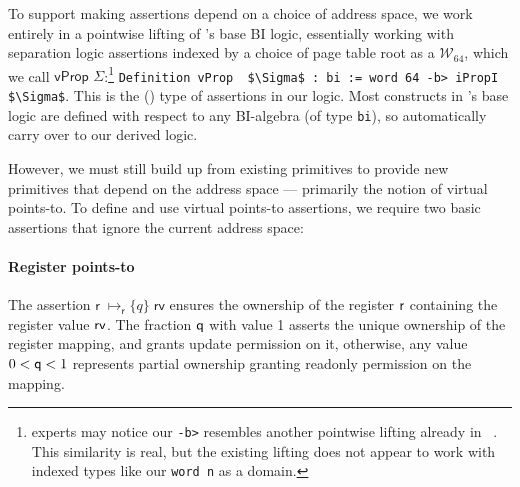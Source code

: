 To support making assertions depend on a choice of address space, we work entirely in a pointwise lifting of \iris's base BI logic,
essentially working with separation logic assertions indexed by a choice of page table root as a $\mathcal{W}_{64}$, which we call $\textsf{vProp }\Sigma$:\footnote{
  \iris experts may notice our \lstinline|-b>| resembles another pointwise lifting already in  \iris~\cite{dang2019rustbelt,dang2022compass}. 
  This similarity is real, but the existing lifting does not appear to work with indexed \coq types
  like our \lstinline|word n| as a domain.
}
\lstinline[language=Coq]|Definition vProp  $\Sigma$ : bi := word 64 -b> iPropI  $\Sigma$|.
This is the (\rocq) type of assertions in our logic.
Most constructs in \iris's base logic are defined with respect to any BI-algebra (of \coq type \lstinline|bi|), so automatically
carry over to our derived logic.

However, we must still build up from existing \iris primitives to provide new primitives that depend on the address space --- primarily the notion
of virtual points-to.
To define and use virtual points-to assertions, we require two basic assertions that ignore
the current address space:

\paragraph{Register points-to} 
The assertion $\textsf{r}\;\mapsto_{\textsf{r}}\{q\}\;\textsf{rv}$ ensures the ownership of the register $\mathsf{r}$ containing the register value $\mathsf{rv}$. 
The fraction $\mathsf{q}$ with value 1 asserts the unique ownership of the register mapping, and grants update permission on it, 
otherwise, any value $0 < \mathsf{q} <1$ represents partial ownership granting readonly permission on the mapping.

